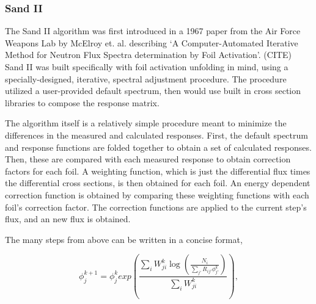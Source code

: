 \subsubsection{Sand II}

The Sand II algorithm was first introduced in a 1967 paper from the Air Force Weapons Lab by McElroy et. al. describing `A Computer-Automated Iterative Method for Neutron Flux Spectra determination by Foil Activation'. (CITE)
Sand II was built specifically with foil activation unfolding in mind, using a specially-designed, iterative, spectral adjustment procedure.
The procedure utilized a user-provided default spectrum, then would use built in cross section libraries to compose the response matrix.

The algorithm itself is a relatively simple procedure meant to minimize the differences in the measured and calculated responses.
First, the default spectrum and response functions are folded together to obtain a set of calculated responses.
Then, these are compared with each measured response to obtain correction factors for each foil.
A weighting function, which is just the differential flux times the differential cross sections, is then obtained for each foil.
An energy dependent correction function is obtained by comparing these weighting functions with each foil's correction factor.
The correction functions are applied to the current step's flux, and an new flux is obtained.

The many steps from above can be written in a concise format,

\begin{equation}\label{eqn:sandii}
\phi_j^{k + 1} = \phi_j^{k} exp(\frac{\sum_i W_{ji}^k \log(\frac{N_i}{\sum_{j'} R_{ij'} \phi_{j'}^k})}{\sum_i W_{ji}^k}) ,
\end{equation}

